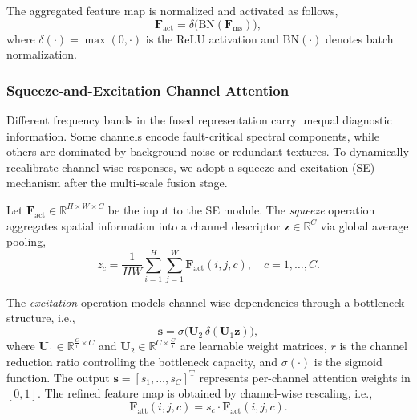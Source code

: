 \documentclass[pdflatex,sn-mathphys-num]{sn-jnl}
\theoremstyle{thmstyleone}%
\theoremstyle{thmstyletwo}%
\theoremstyle{thmstylethree}%
\begin{document}
The aggregated feature map is normalized and activated as follows,
\begin{equation}
\boldsymbol{F}_{\mathrm{act}} = \delta\big(\mathrm{BN}(\boldsymbol{F}_{\mathrm{ms}})\big),
\label{eq:active_feature}
\end{equation}
where $\delta(\cdot) = \max(0, \cdot)$ is the ReLU activation and $\mathrm{BN}(\cdot)$ denotes batch normalization.

\subsubsection{Squeeze-and-Excitation Channel Attention}

Different frequency bands in the fused representation carry unequal diagnostic information. Some channels encode fault-critical spectral components, while others are dominated by background noise or redundant textures. To dynamically recalibrate channel-wise responses, we adopt a squeeze-and-excitation (SE) mechanism after the multi-scale fusion stage.

Let $\boldsymbol{F}_{\mathrm{act}} \in \mathbb{R}^{H \times W \times C}$ be the input to the SE module. The \emph{squeeze} operation aggregates spatial information into a channel descriptor $\boldsymbol{z} \in \mathbb{R}^{C}$ via global average pooling,
\begin{equation}
z_c = \frac{1}{H W} \sum_{i=1}^{H} \sum_{j=1}^{W} \boldsymbol{F}_{\mathrm{act}}(i, j, c), \quad c = 1, \dots, C.
\label{eq:se_squeeze}
\end{equation}

The \emph{excitation} operation models channel-wise dependencies through a bottleneck structure, i.e.,
\begin{equation}
\boldsymbol{s} = \sigma\big(\boldsymbol{U}_2 \, \delta(\boldsymbol{U}_1 \boldsymbol{z})\big),
\label{eq:se_excitation}
\end{equation}
where $\boldsymbol{U}_1 \in \mathbb{R}^{\frac{C}{r} \times C}$ and $\boldsymbol{U}_2 \in \mathbb{R}^{C \times \frac{C}{r}}$ are learnable weight matrices, $r$ is the channel reduction ratio controlling the bottleneck capacity, and $\sigma(\cdot)$ is the sigmoid function. The output $\boldsymbol{s}=[s_1, \dots, s_C]^\mathrm{T}$ represents per-channel attention weights in $[0, 1]$. The refined feature map is obtained by channel-wise rescaling, i.e.,
\begin{equation}
\boldsymbol{F}_{\mathrm{att}}(i, j, c) = s_c \cdot \boldsymbol{F}_{\mathrm{act}}(i, j, c).
\label{eq:attention_feature}
\end{equation}
\end{document}
